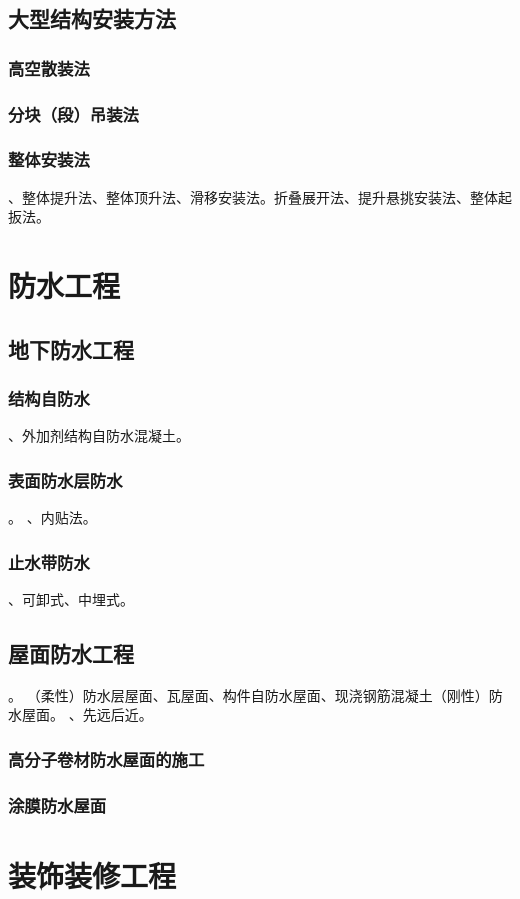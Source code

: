 \documentclass{book}
\begin{document}
\section{大型结构安装方法}
\subsection{高空散装法}
\subsection{分块（段）吊装法}
\subsection{整体安装法}
、整体提升法、整体顶升法、滑移安装法。折叠展开法、提升悬挑安装法、整体起扳法。
\chapter{防水工程}
\section{地下防水工程}
\subsection{结构自防水}
、外加剂结构自防水混凝土。
\subsection{表面防水层防水}
。
、内贴法。
\subsection{止水带防水}
、可卸式、中埋式。
\section{屋面防水工程}
。
（柔性）防水层屋面、瓦屋面、构件自防水屋面、现浇钢筋混凝土（刚性）防水屋面。
、先远后近。
\subsection{高分子卷材防水屋面的施工}
\subsection{涂膜防水屋面}
\chapter{装饰装修工程}
\end{document}
